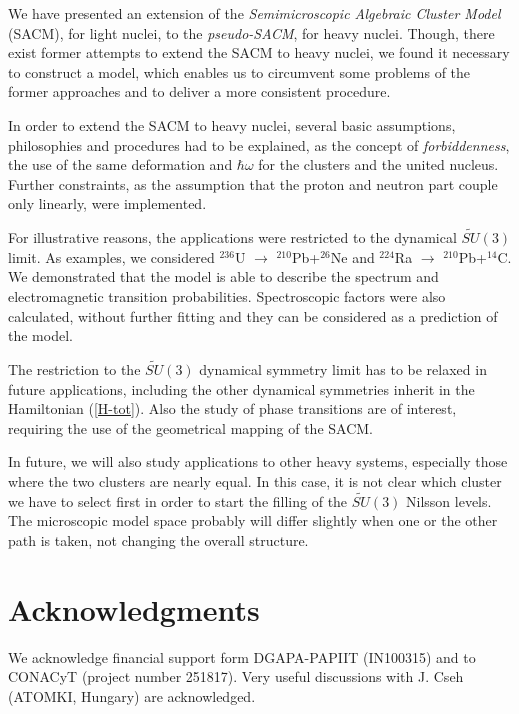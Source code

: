 \documentclass[12pt]{article}
\begin{document}
We have presented an extension of the {\it Semimicroscopic Algebraic Cluster Model} (SACM),
for light nuclei, to the {\it pseudo-SACM}, for heavy nuclei. 
Though, there exist former attempts to extend the
SACM to heavy nuclei, we found it necessary to construct a model, which enables us to 
circumvent some problems of the former approaches and to deliver a more consistent
procedure. 

In order to extend the SACM to heavy nuclei, several basic assumptions, philosophies and 
procedures had to be explained, as the concept of {\it forbiddenness}, the use
of the same deformation and $\hbar\omega$ for the clusters and the united nucleus.
Further constraints, as the assumption that the proton and neutron part couple only linearly,
were implemented.

For illustrative reasons, the applications were restricted to the dynamical 
$\widetilde{SU}(3)$ limit. As examples, we considered 
$^{236}$U $ \rightarrow$ $^{210}$Pb+$^{26}$Ne and
$^{224}$Ra $\rightarrow$ $^{210}$Pb+$^{14}$C. We demonstrated that the model is
able to describe the spectrum and electromagnetic transition probabilities. 
Spectroscopic factors were also calculated, without further fitting and they can be
considered as a prediction of the model. 

The restriction to the $\widetilde{SU}(3)$ dynamical symmetry limit has to be relaxed
in future applications, including the other 
dynamical symmetries inherit in the Hamiltonian (\ref{H-tot}). 
Also the study of phase transitions are of
interest, requiring the use of the geometrical mapping \cite{geom} of the SACM.

In future, we will also study applications to other heavy systems, especially those
where the two clusters are nearly equal. In this case, it is not clear which cluster
we have to select first in order to start the filling of the $\widetilde{SU}(3)$
Nilsson levels. The microscopic model space probably will differ slightly when one
or the other path is taken, not changing the overall structure.

\section*{Acknowledgments}
We acknowledge financial support form DGAPA-PAPIIT (IN100315) and to
CONACyT (project number 251817).
Very useful discussions with J. Cseh (ATOMKI, Hungary) are acknowledged.
\end{document}
